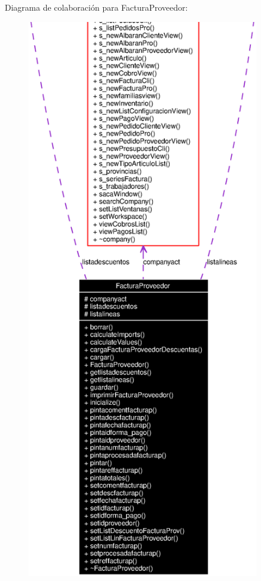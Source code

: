 Diagrama de colaboraci\'{o}n para Factura\-Proveedor:\begin{figure}[H]
\begin{center}
\leavevmode
\includegraphics[width=288pt]{classFacturaProveedor__coll__graph}
\end{center}
\end{figure}
